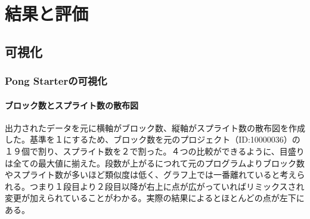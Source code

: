 \documentclass[a4paper,10pt,onecolumn,oneside,openany]{jsbook}
\begin{document}
\part{結果と評価}
\chapter{可視化}
\section{Pong Starterの可視化}

\subsection{ブロック数とスプライト数の散布図}
出力されたデータを元に横軸がブロック数、縦軸がスプライト数の散布図を作成した。基準を１にするため、ブロック数を元のプロジェクト（ID:10000036）の１９個で割り、スプライト数を２で割った。４つの比較ができるように、目盛りは全ての最大値に揃えた。段数が上がるにつれて元のプログラムよりブロック数やスプライト数が多いほど類似度は低く、グラフ上では一番離れていると考えられる。つまり１段目より２段目以降が右上に点が広がっていればリミックスされ変更が加えられていることがわかる。実際の結果によるとほとんどの点が左下にある。
\end{document}
